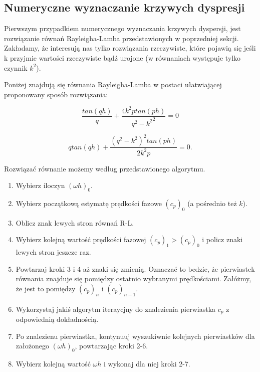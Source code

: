 
\subsection{Numeryczne wyznaczanie krzywych dyspresji}
Pierwszym przypadkiem numerycznego wyznaczania krzywych dyspersji, jest rozwiązanie równań Rayleigha-Lamba przedstawionych w poprzedniej sekcji. Zakładamy, że interesują nas tylko rozwiązania rzeczywiste, które pojawią się jeśli k przyjmie wartości rzeczywiste bądź urojone (w równaniach występuje tylko czynnik \(k^2\)).

Poniżej znajdują się równania Rayleigha-Lamba w postaci ułatwiającej proponowany sposób rozwiązania:

\begin{equation}
\frac{tan(qh)}{q}+\frac{4k^2ptan(ph)}{{q^2-k^2}^2}=0
\end{equation}

\begin{equation}
qtan(qh)+\frac{{(q^2-k^2)}^2tan(ph)}{2k^2p}=0.
\end{equation}

\vspace{5mm}

Rozwiązać równanie możemy według przedstawionego algorytmu.

\begin{enumerate}
  \item Wybierz iloczyn \((\omega h)_0\).
  \item Wybierz początkową estymatę prędkości fazowe \((c_p)_0\) (a pośrednio też \(k\)).
  \item Oblicz znak lewych stron równań R-L.
  \item Wybierz kolejną wartość prędkości fazowej \((c_p)_1 > (c_p)_0\) i policz znaki lewych stron jeszcze raz.
  \item Powtarzaj kroki 3 i 4 aż znaki się zmienią. Oznaczać to bedzie, że pierwiastek równania znajduje się pomiędzy ostatnio wybranymi prędkościami. Załóżmy, że jest to pomiędzy \( (c_p)_n \) i \( (c_p)_{n+1} \).
  \item Wykorzystaj jakiś algorytm iteraycjny do znalezienia pierwiastka \(c_p\) z odpowiednią dokładnością.
   \item Po znalezienu pierwiastka, kontynuuj wyszukiwnie kolejnych pierwiastków dla założonego \( (\omega h)_0 \), powtarzając kroki 2-6.
  \item Wybierz kolejną wartość \( \omega h \) i wykonaj dla niej kroki 2-7.
\end{enumerate}

